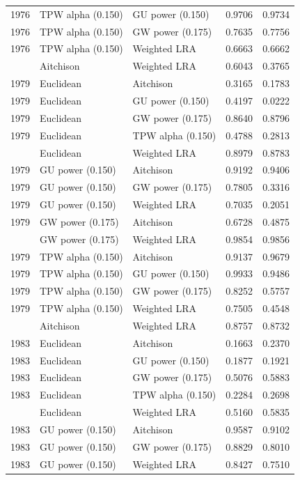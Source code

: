 \begin{longtable}[t]{rllrr}
1976 & TPW alpha (0.150) & GU power (0.150) & 0.9706 & 0.9734\\
1976 & TPW alpha (0.150) & GW power (0.175) & 0.7635 & 0.7756\\
1976 & TPW alpha (0.150) & Weighted LRA & 0.6663 & 0.6662\\
\addlinespace
1979 & Aitchison & Weighted LRA & 0.6043 & 0.3765\\
1979 & Euclidean & Aitchison & 0.3165 & 0.1783\\
1979 & Euclidean & GU power (0.150) & 0.4197 & 0.0222\\
1979 & Euclidean & GW power (0.175) & 0.8640 & 0.8796\\
1979 & Euclidean & TPW alpha (0.150) & 0.4788 & 0.2813\\
\addlinespace
1979 & Euclidean & Weighted LRA & 0.8979 & 0.8783\\
1979 & GU power (0.150) & Aitchison & 0.9192 & 0.9406\\
1979 & GU power (0.150) & GW power (0.175) & 0.7805 & 0.3316\\
1979 & GU power (0.150) & Weighted LRA & 0.7035 & 0.2051\\
1979 & GW power (0.175) & Aitchison & 0.6728 & 0.4875\\
\addlinespace
1979 & GW power (0.175) & Weighted LRA & 0.9854 & 0.9856\\
1979 & TPW alpha (0.150) & Aitchison & 0.9137 & 0.9679\\
1979 & TPW alpha (0.150) & GU power (0.150) & 0.9933 & 0.9486\\
1979 & TPW alpha (0.150) & GW power (0.175) & 0.8252 & 0.5757\\
1979 & TPW alpha (0.150) & Weighted LRA & 0.7505 & 0.4548\\
\addlinespace
1983 & Aitchison & Weighted LRA & 0.8757 & 0.8732\\
1983 & Euclidean & Aitchison & 0.1663 & 0.2370\\
1983 & Euclidean & GU power (0.150) & 0.1877 & 0.1921\\
1983 & Euclidean & GW power (0.175) & 0.5076 & 0.5883\\
1983 & Euclidean & TPW alpha (0.150) & 0.2284 & 0.2698\\
\addlinespace
1983 & Euclidean & Weighted LRA & 0.5160 & 0.5835\\
1983 & GU power (0.150) & Aitchison & 0.9587 & 0.9102\\
1983 & GU power (0.150) & GW power (0.175) & 0.8829 & 0.8010\\
1983 & GU power (0.150) & Weighted LRA & 0.8427 & 0.7510\\

\end{longtable}
